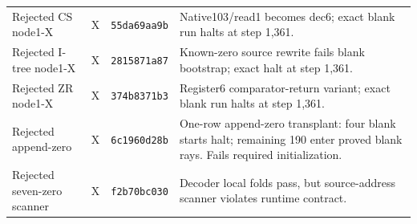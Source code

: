 \begin{longtable}{@{}p{3.3cm}p{1.3cm}p{1.9cm}p{9.1cm}@{}}
Rejected CS node1-\allowbreak X & X & \texttt{55da69aa9b} & Native103/read1 becomes dec6; exact blank run halts at step 1,361.\\[4pt]
Rejected I-\allowbreak tree node1-\allowbreak X & X & \texttt{2815871a87} & Known-zero source rewrite fails blank bootstrap; exact halt at step 1,361.\\[4pt]
Rejected ZR node1-\allowbreak X & X & \texttt{374b8371b3} & Register6 comparator-return variant; exact blank run halts at step 1,361.\\[4pt]
Rejected append-\allowbreak zero & X & \texttt{6c1960d28b} & One-row append-zero transplant: four blank starts halt; remaining 190 enter proved blank rays. Fails required initialization.\\[4pt]
Rejected seven-\allowbreak zero scanner & X & \texttt{f2b70bc030} & Decoder local folds pass, but source-address scanner violates runtime contract.\\[4pt]
\end{longtable}
\normalsize
